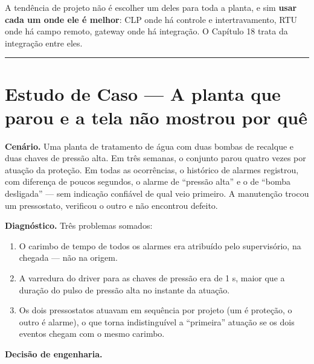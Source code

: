 A tendência de projeto não é escolher um deles para toda a planta, e sim \textbf{usar cada um onde ele é
melhor}: CLP onde há controle e intertravamento, RTU onde há campo remoto, gateway onde há
integração. O Capítulo 18 trata da integração entre eles.

\begin{center}\rule{0.5\linewidth}{0.5pt}\end{center}

\section{\texorpdfstring{Estudo de Caso --- A planta que parou e a tela não mostrou por quê}{Estudo de Caso  A planta que parou e a tela não mostrou por quê}}\label{estudo-de-caso-a-planta-que-parou-e-a-tela-nuxe3o-mostrou-por-quuxea}

\textbf{Cenário.} Uma planta de tratamento de água com duas bombas de recalque e duas chaves de pressão
alta. Em três semanas, o conjunto parou quatro vezes por atuação da proteção. Em todas as
ocorrências, o histórico de alarmes registrou, com diferença de poucos segundos, o alarme de ``pressão
alta'' e o de ``bomba desligada'' --- sem indicação confiável de qual veio primeiro. A manutenção
trocou um pressostato, verificou o outro e não encontrou defeito.

\textbf{Diagnóstico.} Três problemas somados:

\begin{enumerate}
\def\labelenumi{\arabic{enumi}.}
\tightlist
\item
  O carimbo de tempo de todos os alarmes era atribuído pelo supervisório, na chegada --- não na
  origem.
\item
  A varredura do driver para as chaves de pressão era de 1 s, maior que a duração do pulso de
  pressão alta no instante da atuação.
\item
  Os dois pressostatos atuavam em sequência por projeto (um é proteção, o outro é alarme), o que
  torna indistinguível a ``primeira'' atuação se os dois eventos chegam com o mesmo carimbo.
\end{enumerate}

\textbf{Decisão de engenharia.}


